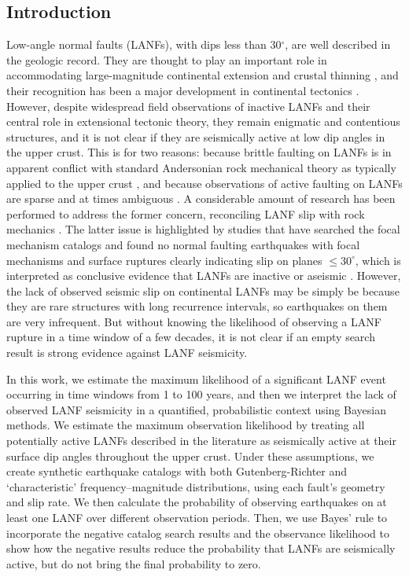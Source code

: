 \documentclass[twocolumn,grl]{AGUTeX}
\begin{document}
\begin{article}

\section{Introduction}
Low-angle normal faults (LANFs), with dips less than 30$^\circ$, are well
described in the geologic record. They are thought to play an important role in
accommodating large-magnitude continental extension \citep{howard1987crustal}
and crustal thinning \citep{lister1986detachment}, and their recognition has
been a major development in continental tectonics
\citep{wernicke2009detachment}. However, despite widespread field observations
of inactive LANFs and their central role in extensional tectonic theory, they
remain enigmatic and contentious structures, and it is not clear if they are
seismically active at low dip angles in the upper crust. This is for two
reasons: because brittle faulting on LANFs is in apparent conflict with
standard Andersonian rock mechanical theory as typically applied to the upper
crust \citep{axen2004lanfmech}, and because observations of active faulting on
LANFs are sparse and at times ambiguous \citep{wernicke1995seis}.
A considerable amount of research has been performed to address the former
concern, reconciling LANF slip with rock mechanics \citep [e.g.,]
[]{axenbartley1997, collettini2011lanfmech}. 
The latter issue is highlighted by studies that have searched the focal mechanism catalogs and found no normal faulting earthquakes with focal mechanisms and surface ruptures clearly indicating slip on planes $\le30^\circ$,
which is interpreted as conclusive evidence that LANFs are inactive or aseismic
\citep{jackson1987, collettinisibson2001}. However, the lack of observed
seismic slip on continental LANFs may be simply be because they are rare
structures with long recurrence intervals, so earthquakes on them are very
infrequent. But without knowing the likelihood of observing a LANF rupture in
a time window of a few decades, it is not clear if an empty search result is
strong evidence against LANF seismicity.

In this work, we estimate the maximum likelihood of a significant LANF event
occurring in time windows from 1 to 100 years, and then we interpret the lack
of observed LANF seismicity in a quantified, probabilistic context using
Bayesian methods. We estimate the maximum observation likelihood by treating
all potentially active LANFs described in the literature as seismically active
at their surface dip angles throughout the upper crust. Under these
assumptions, we create synthetic earthquake catalogs with both
Gutenberg-Richter and `characteristic' frequency--magnitude distributions,
using each fault's geometry and slip rate.  We then calculate the probability
of observing earthquakes on at least one LANF over different observation
periods. Then, we use Bayes' rule to incorporate the negative catalog search
results and the observance likelihood to show how the negative results reduce
the probability that LANFs are seismically active, but do not bring the final
probability to zero.



\end{article}
\end{document}
